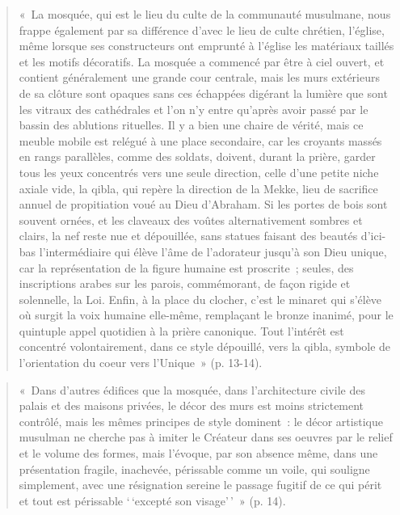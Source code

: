 \begin{quote}
    

«~La mosquée, qui est le lieu du culte de la communauté musulmane, nous
frappe également par sa différence d'avec le lieu de culte chrétien,
l'église, même lorsque ses constructeurs ont emprunté à l'église les
matériaux taillés et les motifs décoratifs. La mosquée a commencé par
être à ciel ouvert, et contient généralement une grande cour centrale,
mais les murs extérieurs de sa clôture sont opaques sans ces échappées
digérant la lumière que sont les vitraux des cathédrales et l'on n'y
entre qu'après avoir passé par le bassin des ablutions rituelles. Il y a
bien une chaire de vérité, mais ce meuble mobile est relégué à une place
secondaire, car les croyants massés en rangs parallèles, comme des
soldats, doivent, durant la prière, garder tous les yeux concentrés vers
une seule direction, celle d'une petite niche axiale vide, la qibla, qui
repère la direction de la Mekke, lieu de sacrifice annuel de
propitiation voué au Dieu d'Abraham. Si les portes de bois sont souvent
ornées, et les claveaux des voûtes alternativement sombres et clairs, la
nef reste nue et dépouillée, sans statues faisant des beautés d'ici-bas
l'intermédiaire qui élève l'âme de l'adorateur jusqu'à son Dieu unique,
car la représentation de la figure humaine est proscrite~; seules, des
inscriptions arabes sur les parois, commémorant, de façon rigide et
solennelle, la Loi. Enfin, à la place du clocher, c'est le minaret qui
s'élève où surgit la voix humaine elle-même, remplaçant le bronze
inanimé, pour le quintuple appel quotidien à la prière canonique. Tout
l'intérêt est concentré volontairement, dans ce style dépouillé, vers la
qibla, symbole de l'orientation du coeur vers l'Unique~» (p. 13-14).
\end{quote}
\begin{quote}
    
«~Dans d'autres édifices que la mosquée, dans l'architecture civile des
palais et des maisons privées, le décor des murs est moins strictement
contrôlé, mais les mêmes principes de style dominent~: le décor
artistique musulman ne cherche pas à imiter le Créateur dans ses  oeuvres
par le relief et le volume des formes, mais l'évoque, par son absence
même, dans une présentation fragile, inachevée, périssable comme un
voile, qui souligne simplement, avec une résignation sereine le passage
fugitif de ce qui périt et tout est périssable `\,`excepté son
visage'\,'~» (p. 14).
\end{quote}

